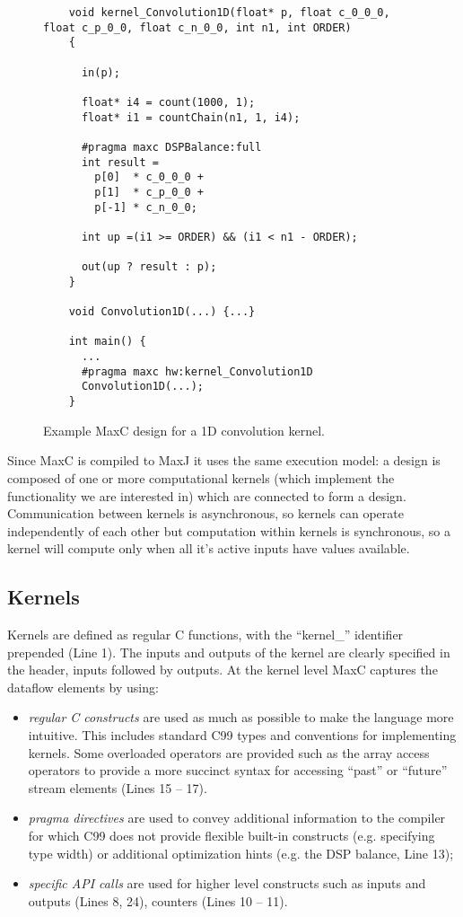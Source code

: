 \begin{figure}[!h]
  \begin{lstlisting}
    void kernel_Convolution1D(float* p, float c_0_0_0, float c_p_0_0, float c_n_0_0, int n1, int ORDER)
    {

      in(p);

      float* i4 = count(1000, 1);
      float* i1 = countChain(n1, 1, i4);

      #pragma maxc DSPBalance:full
      int result =
        p[0]  * c_0_0_0 +
        p[1]  * c_p_0_0 +
        p[-1] * c_n_0_0;

      int up =(i1 >= ORDER) && (i1 < n1 - ORDER);

      out(up ? result : p);
    }

    void Convolution1D(...) {...}

    int main() {
      ...
      #pragma maxc hw:kernel_Convolution1D
      Convolution1D(...);
    }
  \end{lstlisting}
  \caption{Example MaxC design for a 1D convolution kernel.}
  \label{fig:maxc-1dconv}
\end{figure}

Since MaxC is compiled to MaxJ it uses the same execution model: a
design is composed of one or more computational kernels (which
implement the functionality we are interested in) which are connected
to form a design. Communication between kernels is asynchronous, so
kernels can operate independently of each other but computation within
kernels is synchronous, so a kernel will compute only when all it's
active inputs have values available.

\subsection{Kernels}

Kernels are defined as regular C functions, with the ``kernel\_''
identifier prepended (Line 1). The inputs and outputs of the kernel
are clearly specified in the header, inputs followed by outputs. At
the kernel level MaxC captures the dataflow elements by using:

\begin{itemize}
\item \emph{regular C constructs} are used as much as possible to make
  the language more intuitive. This includes standard C99 types and
  conventions for implementing kernels. Some overloaded operators are
  provided such as the array access operators to provide a more
  succinct syntax for accessing ``past'' or ``future'' stream elements
  (Lines 15 -- 17).

\item \emph{pragma directives} are used to convey additional
  information to the compiler for which C99 does not provide flexible
  built-in constructs (e.g. specifying type width) or additional
  optimization hints (e.g. the DSP balance, Line 13);

\item \emph{specific API calls} are used for higher level constructs
  such as inputs and outputs (Lines 8, 24), counters (Lines 10 -- 11).

\end{itemize}


